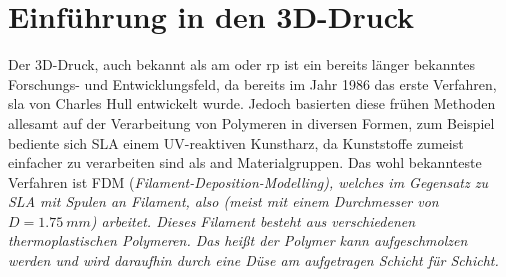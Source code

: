 \documentclass[../main.tex]{subfiles}
\begin{document}
\section{Einführung in den 3D-Druck}
Der 3D-Druck, auch bekannt als \acrfull{am} oder \gls{rp} ist ein bereits länger bekanntes Forschungs- und Entwicklungsfeld, da bereits im Jahr 1986 das erste Verfahren, \acrfull{sla} von Charles Hull entwickelt wurde. 
Jedoch basierten diese frühen Methoden allesamt auf der Verarbeitung von Polymeren in diversen Formen, zum Beispiel bediente sich SLA einem UV-reaktiven Kunstharz, da Kunststoffe zumeist einfacher zu verarbeiten sind als and Materialgruppen. 
Das wohl bekannteste Verfahren ist FDM (\it{Filament-Deposition-Modelling}), welches im Gegensatz zu SLA mit Spulen an Filament, also  (meist mit einem Durchmesser von $D=\qty{1.75}{mm}$) arbeitet. 
Dieses Filament besteht aus verschiedenen thermoplastischen Polymeren. Das heißt der Polymer kann aufgeschmolzen werden und wird daraufhin durch eine Düse am  aufgetragen Schicht für Schicht.
\end{document}

